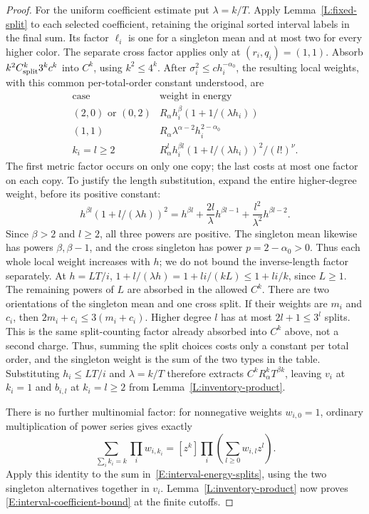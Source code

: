 \documentclass[12pt]{article}
\numberwithin{equation}{section}
\theoremstyle{definition}
\begin{document}
\begin{proof}
  For the uniform coefficient estimate put $\lambda=k/T$.
  Apply Lemma~\ref{L:fixed-split} to each selected coefficient, retaining
  the original sorted interval labels in the final sum.
  Its factor $\ell_i$ is one for a singleton mean and at most two for
  every higher color. The separate cross factor applies only at
  $(r_i,q_i)=(1,1)$.
  Absorb $k^2C_{\rm split}^k3^kc^k$ into $C^k$, using $k^2\le4^k$.
  After $\sigma_i^2\le c h_i^{-\alpha_0}$, the resulting local weights,
  with this common per-total-order constant understood, are
  \[
    \begin{array}{c|c}
      \text{case}&\text{weight in energy}\\ \hline
      (2,0)\text{ or }(0,2)&R_\alpha h_i^\beta
      (1+1/(\lambda h_i))\\
      (1,1)&R_\alpha\lambda^{\alpha-2}h_i^{2-\alpha_0}\\
      k_i=l\ge2&R_\alpha^l h_i^{\beta l}
      (1+l/(\lambda h_i))^2/(l!)^\nu .
    \end{array}
  \]
  The first metric factor occurs on only one copy; the last costs at
  most one factor on each copy. To justify the length substitution,
  expand the entire higher-degree weight, before its positive constant:
  \[
    h^{\beta l}(1+l/(\lambda h))^2
    =h^{\beta l}+\frac{2l}{\lambda}h^{\beta l-1}
    +\frac{l^2}{\lambda^2}h^{\beta l-2}.
  \]
  Since $\beta>2$ and $l\ge2$, all three powers are positive.
  The singleton mean likewise has powers $\beta,\beta-1$, and
  the cross singleton has power $p=2-\alpha_0>0$.
  Thus each whole local weight increases with $h$; we do not bound
  the inverse-length factor separately. At $h=LT/i$,
  $1+l/(\lambda h)=1+li/(kL)\le1+li/k$, since $L\ge1$.
  The remaining powers of $L$ are absorbed in the allowed $C^k$.
  There are two orientations of the singleton mean and one cross split.
  If their weights are $m_i$ and $c_i$, then
  $2m_i+c_i\le3(m_i+c_i)$.
  Higher degree $l$ has at most $2l+1\le3^l$ splits.
  This is the same split-counting factor already absorbed into $C^k$
  above, not a second charge. Thus, summing the split choices costs
  only a constant per total order,
  and the singleton weight is the sum of the two types in the table.
  Substituting $h_i\le LT/i$ and $\lambda=k/T$ therefore extracts
  $C^kR_\alpha^kT^{\beta k}$, leaving $v_i$ at $k_i=1$ and
  $b_{i,l}$ at $k_i=l\ge2$ from Lemma~\ref{L:inventory-product}.

  There is no further multinomial factor: for nonnegative weights
  $w_{i,0}=1$, ordinary multiplication of power series gives exactly
  \[
    \sum_{\sum_i k_i=k}\prod_i w_{i,k_i}
    =[z^k]\prod_i\left(\sum_{l\ge0}w_{i,l}z^l\right).
  \]
  Apply this identity to the sum in~\eqref{E:interval-energy-splits},
  using the two singleton alternatives together in $v_i$.
  Lemma~\ref{L:inventory-product} now proves
  \eqref{E:interval-coefficient-bound} at the finite cutoffs.


\end{proof}
\end{document}
